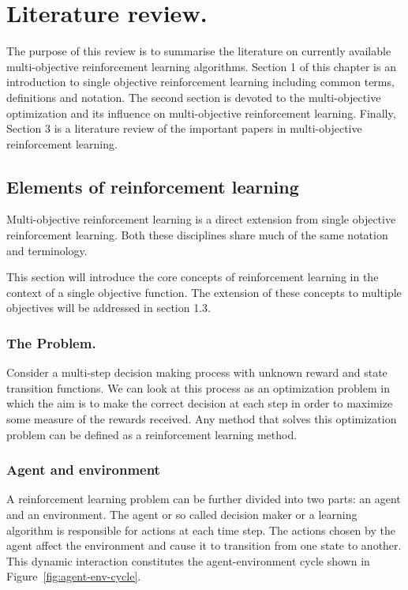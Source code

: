 \chapter{Literature review.}

The purpose of this review is to summarise the literature on currently available multi-objective reinforcement learning algorithms. Section 1 of this chapter is an introduction to single objective reinforcement learning including common terms, definitions and notation. The second section is devoted to the multi-objective optimization and its influence on multi-objective reinforcement learning. Finally, Section 3 is a literature review of the important papers in multi-objective reinforcement learning.

\section{Elements of reinforcement learning}
Multi-objective reinforcement learning is a direct extension from single objective reinforcement learning. Both these disciplines share much of the same notation and terminology.

This section will introduce the core concepts of reinforcement learning in the context of a single objective function. The extension of these concepts to multiple objectives will be addressed in section 1.3.

\subsection{The Problem.}

Consider a multi-step decision making process with unknown reward and state transition functions. We can look at this process as an optimization problem in which the aim is to make the correct decision at each step in order to maximize some measure of the rewards received. Any method that solves this optimization problem can be defined as a reinforcement learning method.

\subsection{Agent and environment}
\label{sec:agent-and-environment}

A reinforcement learning problem can be further divided into two parts: an agent and an environment. The agent or so called decision maker or a learning algorithm is responsible for actions at each time step. The actions chosen by the agent affect the environment and cause it to transition from one state to another. This dynamic interaction constitutes the agent-environment cycle shown in Figure~\ref{fig:agent-env-cycle}.

